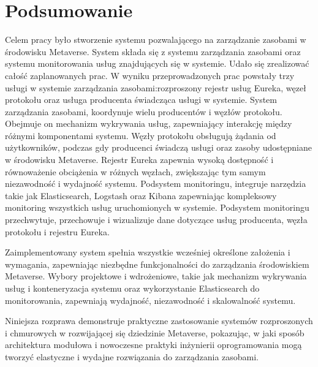 \chapter{Podsumowanie}

Celem pracy było stworzenie systemu pozwalającego na zarządzanie zasobami w środowisku Metaverse. System składa się z systemu zarządzania zasobami oraz systemu monitorowania usług znajdujących się w systemie. Udało się zrealizować całość zaplanowanych prac. W wyniku przeprowadzonych prac powstały trzy usługi w systemie zarządzania zasobami:rozproszony rejestr usług Eureka, węzeł protokołu oraz usługa producenta świadcząca usługi w systemie. System zarządzania zasobami, koordynuje wielu producentów i węzłów protokołu. Obejmuje on mechanizm wykrywania usług, zapewniający interakcję między różnymi komponentami systemu. Węzły protokołu obsługują żądania od użytkowników, podczas gdy producenci świadczą usługi oraz zasoby udostępniane w środowisku Metaverse. Rejestr Eureka zapewnia wysoką dostępność i równoważenie obciążenia w różnych węzłach, zwiększając tym samym niezawodność i wydajność systemu. Podsystem monitoringu, integruje narzędzia takie jak Elasticsearch, Logstash oraz Kibana zapewniając kompleksowy monitoring wszystkich usług uruchomionych w systemie. Podsystem monitoringu przechwytuje, przechowuje i wizualizuje dane dotyczące usług producenta, węzła protokołu i rejestru Eureka. 

Zaimplementowany system spełnia wszystkie wcześniej określone założenia i wymagania, zapewniając niezbędne funkcjonalności do zarządzania środowiskiem Metaverse. Wybory projektowe i wdrożeniowe, takie jak mechanizm wykrywania usług i konteneryzacja systemu oraz wykorzystanie Elasticsearch do monitorowania, zapewniają wydajność, niezawodność i skalowalność systemu.

Niniejsza rozprawa demonstruje praktyczne zastosowanie systemów rozproszonych i chmurowych w rozwijającej się dziedzinie Metaverse, pokazując, w jaki sposób architektura modułowa i nowoczesne praktyki inżynierii oprogramowania mogą tworzyć elastyczne i wydajne rozwiązania do zarządzania zasobami.

